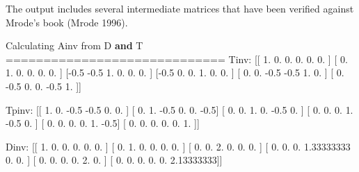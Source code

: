 \documentclass[
  letterpaper,
  DIV=11,
  numbers=noendperiod]{scrreprt}
\newenvironment{Shaded}{\begin{snugshade}}{\end{snugshade}}
\newcommand{\FloatTok}[1]{\textcolor[rgb]{0.68,0.00,0.00}{#1}}
\newcommand{\ImportTok}[1]{\textcolor[rgb]{0.00,0.46,0.62}{#1}}
\newcommand{\KeywordTok}[1]{\textcolor[rgb]{0.00,0.23,0.31}{\textbf{#1}}}
\newcommand{\NormalTok}[1]{\textcolor[rgb]{0.00,0.23,0.31}{#1}}
\newcommand{\OperatorTok}[1]{\textcolor[rgb]{0.37,0.37,0.37}{#1}}
\begin{document}
The output includes several intermediate matrices that have been
verified against Mrode's book (Mrode 1996).

\begin{Shaded}
\begin{Highlighting}[]
\NormalTok{Calculating Ainv }\ImportTok{from}\NormalTok{ D }\KeywordTok{and}\NormalTok{ T}
\OperatorTok{=============================}
\NormalTok{Tinv:  [[ }\FloatTok{1.}   \FloatTok{0.}   \FloatTok{0.}   \FloatTok{0.}   \FloatTok{0.}   \FloatTok{0.}\NormalTok{ ]}
\NormalTok{ [ }\FloatTok{0.}   \FloatTok{1.}   \FloatTok{0.}   \FloatTok{0.}   \FloatTok{0.}   \FloatTok{0.}\NormalTok{ ]}
\NormalTok{ [}\OperatorTok{{-}}\FloatTok{0.5} \OperatorTok{{-}}\FloatTok{0.5}  \FloatTok{1.}   \FloatTok{0.}   \FloatTok{0.}   \FloatTok{0.}\NormalTok{ ]}
\NormalTok{ [}\OperatorTok{{-}}\FloatTok{0.5}  \FloatTok{0.}   \FloatTok{0.}   \FloatTok{1.}   \FloatTok{0.}   \FloatTok{0.}\NormalTok{ ]}
\NormalTok{ [ }\FloatTok{0.}   \FloatTok{0.}  \OperatorTok{{-}}\FloatTok{0.5} \OperatorTok{{-}}\FloatTok{0.5}  \FloatTok{1.}   \FloatTok{0.}\NormalTok{ ]}
\NormalTok{ [ }\FloatTok{0.}  \OperatorTok{{-}}\FloatTok{0.5}  \FloatTok{0.}   \FloatTok{0.}  \OperatorTok{{-}}\FloatTok{0.5}  \FloatTok{1.}\NormalTok{ ]]}

\NormalTok{Tpinv:  [[ }\FloatTok{1.}   \FloatTok{0.}  \OperatorTok{{-}}\FloatTok{0.5} \OperatorTok{{-}}\FloatTok{0.5}  \FloatTok{0.}   \FloatTok{0.}\NormalTok{ ]}
\NormalTok{ [ }\FloatTok{0.}   \FloatTok{1.}  \OperatorTok{{-}}\FloatTok{0.5}  \FloatTok{0.}   \FloatTok{0.}  \OperatorTok{{-}}\FloatTok{0.5}\NormalTok{]}
\NormalTok{ [ }\FloatTok{0.}   \FloatTok{0.}   \FloatTok{1.}   \FloatTok{0.}  \OperatorTok{{-}}\FloatTok{0.5}  \FloatTok{0.}\NormalTok{ ]}
\NormalTok{ [ }\FloatTok{0.}   \FloatTok{0.}   \FloatTok{0.}   \FloatTok{1.}  \OperatorTok{{-}}\FloatTok{0.5}  \FloatTok{0.}\NormalTok{ ]}
\NormalTok{ [ }\FloatTok{0.}   \FloatTok{0.}   \FloatTok{0.}   \FloatTok{0.}   \FloatTok{1.}  \OperatorTok{{-}}\FloatTok{0.5}\NormalTok{]}
\NormalTok{ [ }\FloatTok{0.}   \FloatTok{0.}   \FloatTok{0.}   \FloatTok{0.}   \FloatTok{0.}   \FloatTok{1.}\NormalTok{ ]]}

\NormalTok{Dinv:  [[ }\FloatTok{1.}          \FloatTok{0.}          \FloatTok{0.}          \FloatTok{0.}          \FloatTok{0.}          \FloatTok{0.}\NormalTok{        ]}
\NormalTok{ [ }\FloatTok{0.}          \FloatTok{1.}          \FloatTok{0.}          \FloatTok{0.}          \FloatTok{0.}          \FloatTok{0.}\NormalTok{        ]}
\NormalTok{ [ }\FloatTok{0.}          \FloatTok{0.}          \FloatTok{2.}          \FloatTok{0.}          \FloatTok{0.}          \FloatTok{0.}\NormalTok{        ]}
\NormalTok{ [ }\FloatTok{0.}          \FloatTok{0.}          \FloatTok{0.}          \FloatTok{1.33333333}  \FloatTok{0.}          \FloatTok{0.}\NormalTok{        ]}
\NormalTok{ [ }\FloatTok{0.}          \FloatTok{0.}          \FloatTok{0.}          \FloatTok{0.}          \FloatTok{2.}          \FloatTok{0.}\NormalTok{        ]}
\NormalTok{ [ }\FloatTok{0.}          \FloatTok{0.}          \FloatTok{0.}          \FloatTok{0.}          \FloatTok{0.}          \FloatTok{2.13333333}\NormalTok{]]}


\end{Highlighting}
\end{Shaded}
\end{document}
